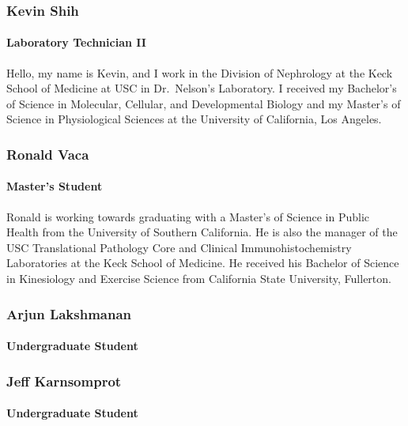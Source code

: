 \documentclass[
]{article}
\begin{document}
\subsubsection{Kevin Shih}\label{kevin-shih}

\paragraph{Laboratory Technician II}\label{laboratory-technician-ii-1}

Hello, my name is Kevin, and I work in the Division of Nephrology at the
Keck School of Medicine at USC in Dr.~Nelson's Laboratory. I received my
Bachelor's of Science in Molecular, Cellular, and Developmental Biology
and my Master's of Science in Physiological Sciences at the University
of California, Los Angeles.

\subsubsection{Ronald Vaca}\label{ronald-vaca}

\paragraph{Master's Student}\label{masters-student}

Ronald is working towards graduating with a Master's of Science in
Public Health from the University of Southern California. He is also the
manager of the USC Translational Pathology Core and Clinical
Immunohistochemistry Laboratories at the Keck School of Medicine. He
received his Bachelor of Science in Kinesiology and Exercise Science
from California State University, Fullerton.

\subsubsection{Arjun Lakshmanan}\label{arjun-lakshmanan}

\paragraph{Undergraduate Student}\label{undergraduate-student}

\subsubsection{Jeff Karnsomprot}\label{jeff-karnsomprot}

\paragraph{Undergraduate Student}\label{undergraduate-student-1}
\end{document}
